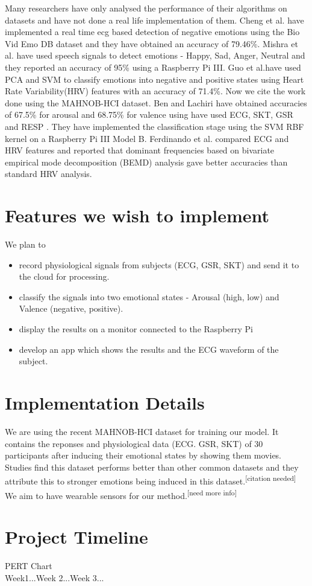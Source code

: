 \documentclass[11pt]{article}
\theoremstyle{definition}
\begin{document}
    Many researchers have only analysed the performance of their algorithms on datasets and have not done a real life implementation of them.
    Cheng et al.\cite{cheng_novel_2017} have implemented a real time ecg based detection of negative emotions using the Bio Vid Emo DB dataset and they have obtained an accuracy of 79.46\%. 
    Mishra et al.\cite{mishra_real_2017} have used speech signals to detect emotions - Happy, Sad, Anger, Neutral and they reported an accuracy of 95\% using a Raspberry Pi III.
    Guo et al.\cite{guo_heart_2016}have used PCA and SVM to classify emotions into negative and positive states using Heart Rate Variability(HRV) features with an accuracy of 71.4\%.
    Now we cite the work done using the MAHNOB-HCI dataset\cite{soleymani_multimodal_2012}. 
    Ben and Lachiri\cite{ben_emotion_2017} have obtained accuracies of 67.5\% for arousal and 68.75\% for valence using have used ECG, SKT, GSR and RESP . They have implemented the classification stage using the SVM RBF kernel on a Raspberry Pi III Model B.
    Ferdinando et al.\cite{ferdinando_comparing_2016} compared ECG and HRV features and reported that dominant frequencies based on
    bivariate empirical mode decomposition (BEMD) analysis gave better accuracies than standard HRV analysis.
   
  \section{Features we wish to implement}
    We plan to 
    \begin{itemize}
      \item record physiological signals from subjects (ECG, GSR, SKT) and send it to the cloud for processing.
      \item classify the signals into two emotional states - Arousal (high, low) and Valence (negative, positive)\cite{ben_emotion_2017}.
      \item display the results on a monitor connected to the Raspberry Pi
      \item develop an app which shows the results and the ECG waveform of the subject.
    \end{itemize}

  \section{Implementation Details}
    We are using the recent MAHNOB-HCI dataset\cite{soleymani_multimodal_2012} for training our model. 
    It contains the reponses and physiological data (ECG. GSR, SKT) of 30 participants after inducing their emotional states by showing them movies. 
    Studies find this dataset performs better than other common datasets and they attribute this to stronger emotions being induced in this dataset.\textsuperscript{[citation needed]}
    We aim to have wearable sensors for our method.\textsuperscript{[need more info]}

  \section{Project Timeline}
    PERT Chart\\
    Week1...Week 2...Week 3...
  
  \newpage
  
  
\end{document}
